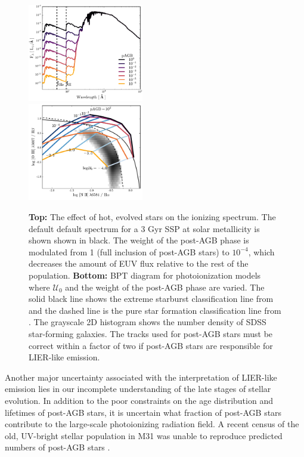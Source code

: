 \documentclass[trackchanges, twocolumn, tighten]{aastex61}
\newcommand{\U}{\ensuremath{\mathcal{U}_{0}}}
\begin{document}
\begin{figure}
  \begin{centering}
    \includegraphics[width=0.45\textwidth]{f26a.pdf}\\
    \includegraphics[width=0.45\textwidth]{f26b.pdf}
    \caption{\textbf{Top:} The effect of hot, evolved stars on the ionizing spectrum. The default default spectrum for a 3 Gyr SSP at solar metallicity is shown shown in black. The weight of the post-AGB phase is modulated from 1 (full inclusion of post-AGB stars) to $10^{-4}$, which decreases the amount of EUV flux relative to the rest of the population. \textbf{Bottom:} BPT diagram for photoionization models where \U{} and the weight of the post-AGB phase are varied. The solid black line shows the extreme starburst classification line from \citet{Kewley01} and the dashed line is the pure star formation classification line from \citet{Kauffmann03a}. The grayscale 2D histogram shows the number density of SDSS star-forming galaxies. The \citet{Vassiliadis} tracks used for post-AGB stars must be correct within a factor of two if post-AGB stars are responsible for LIER-like emission.}
    \label{fig:hotstars}
  \end{centering}
\end{figure}

Another major uncertainty associated with the interpretation of LIER-like emission lies in our incomplete understanding of the late stages of stellar evolution. In addition to the poor constraints on the age distribution and lifetimes of post-AGB stars, it is uncertain what fraction of post-AGB stars contribute to the large-scale photoionizing radiation field. A recent census of the old, UV-bright stellar population in M31 was unable to reproduce predicted numbers of post-AGB stars \citep{Rosenfield12}. 
\end{document}
